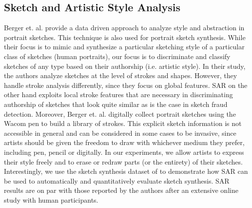 \subsection{Sketch and Artistic Style Analysis}\label{subsec: artisticanalysis}
\vspace{-2mm}
Berger et. al.  provide a data driven approach to analyze style and abstraction in portrait sketches. This technique is also used for portrait sketch synthesis. While their focus is to mimic and synthesize a particular sketching style of a particular class of sketches (human portraits), our focus is to discriminate and classify sketches of any type based on their authorship (i.e. artistic style). In their study, the authors analyze sketches at the level of strokes and shapes. However, they handle stroke analysis differently, since they focus on global features. SAR on the other hand exploits local stroke features that are necessary in discriminating authorship of sketches that look quite similar as is the case in sketch fraud detection. Moreover, Berger et. al.   digitally collect portrait sketches using the Wacom pen to build a library of strokes. This explicit sketch information is not accessible in general and can be considered in some cases to be invasive, since artists should be given the freedom to draw with whichever medium they prefer, including pen, pencil or digitally. In our experiments, we allow artists to express their style freely and to erase or redraw parts (or the entirety) of their sketches. Interestingly, we use the sketch synthesis dataset of \cite{Berger:2013:SAP:2461912.2461964} to demonstrate how SAR can be used to automatically and quantitatively evaluate sketch synthesis. SAR results are on par with those reported by the authors after an extensive online study with human participants.

